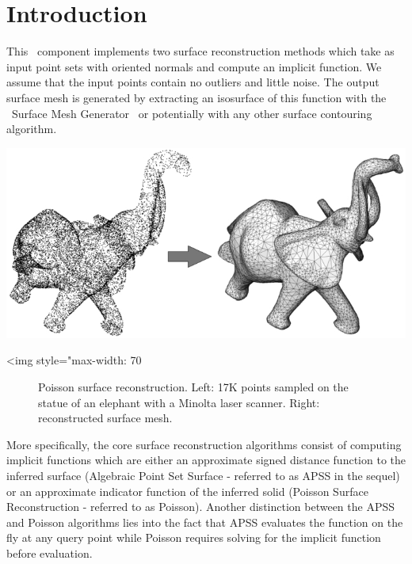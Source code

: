 \section{Introduction}

This \cgal\ component implements two surface reconstruction methods which take as input point sets with oriented normals and compute an implicit function. We assume that the input points contain no outliers and little noise. The output surface mesh is generated by extracting an isosurface of this function with the \cgal\ Surface Mesh Generator~\cite{cgal:ry-gsddrm-06} or potentially with any other surface contouring algorithm.

\begin{center}
    \begin{ccTexOnly}
        \includegraphics[width=1.0\textwidth]{Surface_reconstruction_points_3/introduction} %
    \end{ccTexOnly}
    \begin{ccHtmlOnly}
        <img style="max-width: 70%
    \end{ccHtmlOnly}
    \begin{figure}[h]
        \caption{Poisson surface reconstruction.
                 Left: 17K points sampled on the statue of an
                 elephant with a Minolta laser scanner.
                 Right: reconstructed surface mesh.}
        \label{Surface_reconstruction_points_3-fig-introduction}
    \end{figure}
\end{center}

More specifically, the core surface reconstruction algorithms consist of computing implicit functions which are either an approximate signed distance function to the inferred surface (Algebraic Point Set Surface - referred to as APSS in the sequel) or an approximate indicator function of the inferred solid (Poisson Surface Reconstruction - referred to as Poisson). Another distinction between the APSS and Poisson algorithms lies into the fact that APSS evaluates the function on the fly at any query point while Poisson requires solving for the implicit function before evaluation.


